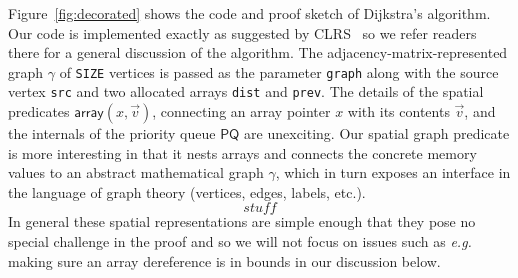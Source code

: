
Figure~\ref{fig:decorated} shows the code and proof
sketch of Dijkstra's algorithm.  Our code is implemented exactly
as suggested by CLRS~\cite{clrs} so we refer readers there for a
general discussion of the algorithm.
The adjacency-matrix-represented graph $\gamma$ of \texttt{SIZE} vertices
is passed as the parameter \texttt{graph} along with the source vertex \texttt{src}
and two allocated arrays \texttt{dist} and \texttt{prev}.
The details of the spatial predicates $\mathsf{array}(x,\vec{v})$, connecting an array pointer $x$ with its contents $\vec{v}$, and the internals of the priority
queue $\mathsf{PQ}$ are unexciting.  Our spatial graph predicate is more interesting in
that it nests arrays and connects the concrete memory values to an abstract mathematical
graph $\gamma$, which in turn exposes an interface in the language of graph theory
(vertices, edges, labels, etc.).
\[
stuff
\]
In general these spatial representations are simple enough that they pose no special
challenge in the proof and so we will not focus on issues such as \emph{e.g.} making
sure an array dereference is in bounds in our discussion below.

